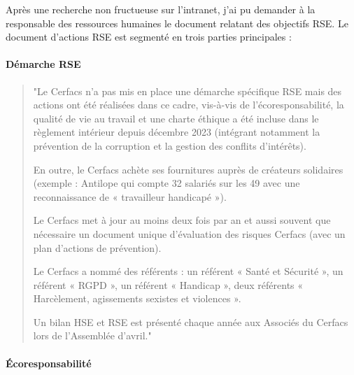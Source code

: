 \newpage


Après une recherche non fructueuse sur l'intranet, j'ai pu demander à la responsable des ressources humaines le document relatant des objectifs \ac{RSE}. Le document d'actions RSE est segmenté en trois parties principales :

\paragraph{Démarche RSE}


\begin{quote}
\setlength{\leftmargin}{0.5cm} %
\setlength{\rightmargin}{0.5cm} %
    "Le Cerfacs n’a pas mis en place une démarche spécifique RSE mais des actions ont été réalisées dans
    ce cadre, vis-à-vis de l’écoresponsabilité, la qualité de vie au travail et une charte éthique a été
    incluse dans le règlement intérieur depuis décembre 2023 (intégrant notamment la prévention de la
    corruption et la gestion des conflits d’intérêts).

    En outre, le Cerfacs achète ses fournitures auprès de créateurs solidaires (exemple : Antilope qui
    compte 32 salariés sur les 49 avec une reconnaissance de « travailleur handicapé »).

    Le Cerfacs met à jour au moins deux fois par an et aussi souvent que nécessaire un document unique
    d’évaluation des risques Cerfacs (avec un plan d’actions de prévention).

    Le Cerfacs a nommé des référents : un référent « Santé et Sécurité », un référent « \ac{RGPD} », un
    référent « Handicap », deux référents « Harcèlement, agissements sexistes et violences ».

    Un bilan HSE et RSE est présenté chaque année aux Associés du Cerfacs lors de l’Assemblée d’avril."
\end{quote}



\paragraph{Écoresponsabilité}
\hspace{0,5cm}


